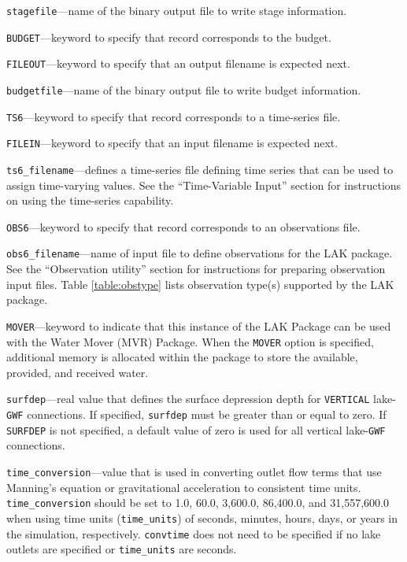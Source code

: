 \item \texttt{stagefile}---name of the binary output file to write stage information.

\item \texttt{BUDGET}---keyword to specify that record corresponds to the budget.

\item \texttt{FILEOUT}---keyword to specify that an output filename is expected next.

\item \texttt{budgetfile}---name of the binary output file to write budget information.

\item \texttt{TS6}---keyword to specify that record corresponds to a time-series file.

\item \texttt{FILEIN}---keyword to specify that an input filename is expected next.

\item \texttt{ts6\_filename}---defines a time-series file defining time series that can be used to assign time-varying values. See the ``Time-Variable Input'' section for instructions on using the time-series capability.

\item \texttt{OBS6}---keyword to specify that record corresponds to an observations file.

\item \texttt{obs6\_filename}---name of input file to define observations for the LAK package. See the ``Observation utility'' section for instructions for preparing observation input files. Table \ref{table:obstype} lists observation type(s) supported by the LAK package.

\item \texttt{MOVER}---keyword to indicate that this instance of the LAK Package can be used with the Water Mover (MVR) Package.  When the \texttt{MOVER} option is specified, additional memory is allocated within the package to store the available, provided, and received water.

\item \texttt{surfdep}---real value that defines the surface depression depth for \texttt{VERTICAL} lake-\texttt{GWF} connections. If specified, \texttt{surfdep} must be greater than or equal to zero. If \texttt{SURFDEP} is not specified, a default value of zero is used for all vertical lake-\texttt{GWF} connections.

\item \texttt{time\_conversion}---value that is used in converting outlet flow terms that use Manning's equation or gravitational acceleration to consistent time units. \texttt{time\_conversion} should be set to 1.0, 60.0, 3,600.0, 86,400.0, and 31,557,600.0 when using time units (\texttt{time\_units}) of seconds, minutes, hours, days, or years in the simulation, respectively. \texttt{convtime} does not need to be specified if no lake outlets are specified or \texttt{time\_units} are seconds.

